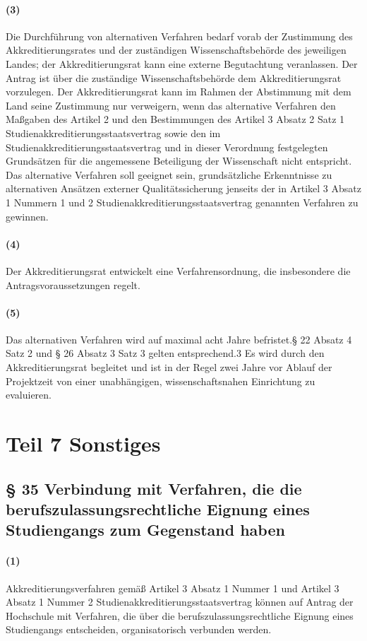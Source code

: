 \documentclass[a4paper]{scrartcl}
\begin{document}
\paragraph{(3)} Die Durchführung von alternativen Verfahren bedarf vorab der Zustimmung des Akkreditierungsrates und der zuständigen Wissenschaftsbehörde des jeweiligen Landes; der Akkreditierungsrat kann eine externe Begutachtung veranlassen. Der Antrag ist über die zuständige Wissenschaftsbehörde dem Akkreditierungsrat vorzulegen. Der Akkreditierungsrat kann im Rahmen der Abstimmung mit dem Land seine Zustimmung nur verweigern, wenn das alternative Verfahren den Maßgaben des Artikel 2 und den Bestimmungen des Artikel 3 Absatz 2 Satz 1 Studienakkreditierungsstaatsvertrag sowie den im Studienakkreditierungsstaatsvertrag und in dieser Verordnung festgelegten Grundsätzen für die angemessene Beteiligung der Wissenschaft nicht entspricht. Das alternative Verfahren soll geeignet sein, grundsätzliche Erkenntnisse zu alternativen Ansätzen externer Qualitätssicherung jenseits der in Artikel 3 Absatz 1 Nummern 1 und 2
Studienakkreditierungsstaatsvertrag genannten Verfahren zu gewinnen.
\paragraph{(4)} Der Akkreditierungsrat entwickelt eine Verfahrensordnung, die insbesondere die Antragsvoraussetzungen regelt.
\paragraph{(5)} Das alternativen Verfahren wird auf maximal acht Jahre befristet.§ 22 Absatz 4 Satz 2 und § 26 Absatz 3 Satz 3 gelten entsprechend.3 Es wird durch den Akkreditierungsrat begleitet und ist in der Regel zwei Jahre vor Ablauf der Projektzeit von einer unabhängigen, wissenschaftsnahen Einrichtung zu evaluieren.
\section{Teil 7 Sonstiges}
\subsection{§ 35 Verbindung mit Verfahren, die die berufszulassungsrechtliche Eignung eines Studiengangs zum Gegenstand haben }
\paragraph{(1)} Akkreditierungsverfahren gemäß Artikel 3 Absatz 1 Nummer 1 und Artikel 3 Absatz 1 Nummer 2 Studienakkreditierungsstaatsvertrag können auf Antrag der Hochschule mit Verfahren, die über die berufszulassungsrechtliche Eignung eines Studiengangs entscheiden, organisatorisch verbunden werden.
\end{document}
